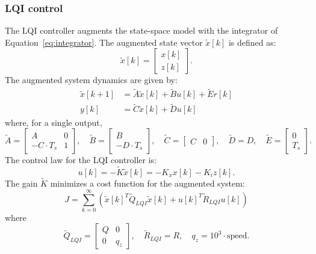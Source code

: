 \documentclass[12pt,a4paper]{article}
\begin{document}
\subsubsection{LQI control}
The LQI controller augments the state-space model with the integrator of Equation~\eqref{eq:integrator}. The augmented state vector $\tilde{x}[k]$ is defined as:
\begin{equation}
\tilde{x}[k] = \begin{bmatrix} x[k] \\ z[k] \end{bmatrix}.
\end{equation}
The augmented system dynamics are given by:
\begin{equation}
\begin{aligned}
\tilde{x}[k+1] &= \tilde{A} \tilde{x}[k] + \tilde{B} u[k] + \tilde{E} r[k] \\
y[k] &= \tilde{C} \tilde{x}[k] + \tilde{D} u[k]
\end{aligned}
\end{equation}
where, for a single output,
\begin{equation}
\tilde{A} = \begin{bmatrix} A & 0 \\ -C \cdot T_s & 1 \end{bmatrix}, \quad
\tilde{B} = \begin{bmatrix} B \\ -D \cdot T_s \end{bmatrix}, \quad
\tilde{C} = \begin{bmatrix} C & 0 \end{bmatrix}, \quad
\tilde{D} = D, \quad
\tilde{E} = \begin{bmatrix} 0 \\ T_s \end{bmatrix}.
\label{eq:augmented}
\end{equation}
The control law for the LQI controller is:
\begin{equation}
u[k] = -\tilde{K} \tilde{x}[k] = -K_x x[k] - K_i z[k].
\end{equation}
The gain $\tilde{K}$ minimizes a cost function for the augmented system:
\begin{equation}
J = \sum_{k=0}^{\infty} \left(\tilde{x}[k]^T \tilde{Q}_{LQI} \tilde{x}[k] + u[k]^T \tilde{R}_{LQI} u[k]\right)
\end{equation}
where
\begin{equation}
\tilde{Q}_{LQI} = \begin{bmatrix} Q & 0 \\ 0 & q_z \end{bmatrix}, \quad
\tilde{R}_{LQI} = R, \quad q_z = 10^3 \cdot \text{speed}.
\label{eq:weight}
\end{equation}
\end{document}
